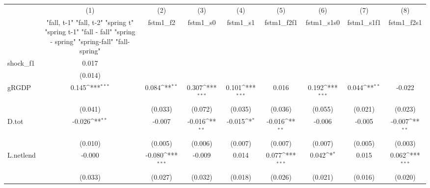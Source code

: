 {
\def\sym#1{\ifmmode^{#1}\else\(^{#1}\)\fi}
\begin{tabular}{l*{8}{c}}
\toprule
            &\multicolumn{1}{c}{(1)}&\multicolumn{1}{c}{(2)}&\multicolumn{1}{c}{(3)}&\multicolumn{1}{c}{(4)}&\multicolumn{1}{c}{(5)}&\multicolumn{1}{c}{(6)}&\multicolumn{1}{c}{(7)}&\multicolumn{1}{c}{(8)}\\
            &\multicolumn{1}{c}{  "fall, t-1" "fall, t-2" "spring t" "spring t-1"  "fall - fall" "spring - spring" "spring-fall" "fall-spring" }&\multicolumn{1}{c}{fstm1\_f2}&\multicolumn{1}{c}{fstm1\_s0}&\multicolumn{1}{c}{fstm1\_s1}&\multicolumn{1}{c}{fstm1\_f2f1}&\multicolumn{1}{c}{fstm1\_s1s0}&\multicolumn{1}{c}{fstm1\_s1f1}&\multicolumn{1}{c}{fstm1\_f2s1}\\
\midrule
shock\_f1    &       0.017         &                     &                     &                     &                     &                     &                     &                     \\
            &     (0.014)         &                     &                     &                     &                     &                     &                     &                     \\
\addlinespace
gRGDP       &       0.145\sym{***}&       0.084\sym{**} &       0.307\sym{***}&       0.101\sym{***}&       0.016         &       0.192\sym{***}&       0.044\sym{**} &      -0.022         \\
            &     (0.041)         &     (0.033)         &     (0.072)         &     (0.035)         &     (0.036)         &     (0.055)         &     (0.021)         &     (0.023)         \\
\addlinespace
D.tot       &      -0.026\sym{**} &      -0.007         &      -0.016\sym{**} &      -0.015\sym{*}  &      -0.016\sym{**} &      -0.006         &      -0.005         &      -0.007\sym{**} \\
            &     (0.010)         &     (0.005)         &     (0.006)         &     (0.007)         &     (0.007)         &     (0.007)         &     (0.005)         &     (0.003)         \\
\addlinespace
L.netlend   &      -0.000         &      -0.080\sym{***}&      -0.009         &       0.014         &       0.077\sym{***}&       0.042\sym{*}  &       0.015         &       0.062\sym{***}\\
            &     (0.033)         &     (0.027)         &     (0.032)         &     (0.018)         &     (0.026)         &     (0.021)         &     (0.016)         &     (0.020)         \\

\end{tabular}}
